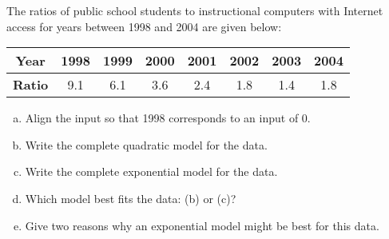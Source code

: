 \documentclass[notes]{subfiles}
\begin{document}
		\begin{ex}
			The ratios of public school students to instructional computers with Internet access for years between 1998 and 2004 are given below:
				\begin{center}
					{\renewcommand{\arraystretch}{1.2}
					\begin{tabular}{|c||c|c|c|c|c|c|c|}\hline
						\textbf{Year} & 1998 & 1999 & 2000 & 2001 & 2002 & 2003 & 2004 \\ \hline
						\textbf{Ratio} & 9.1 & 6.1 & 3.6 & 2.4 & 1.8 & 1.4 & 1.8\\ \hline
					\end{tabular}
					}
				\end{center}
				\begin{enumerate}[(a)]
					\item Align the input so that 1998 corresponds to an input of 0.
					\item Write the complete quadratic model for the data.
					\item Write the complete exponential model for the data.
					\item Which model best fits the data: (b) or (c)?
					\item Give two reasons why an exponential model might be best for this data.
				\end{enumerate}
		\end{ex}

	
	\clearpage
\end{document}
